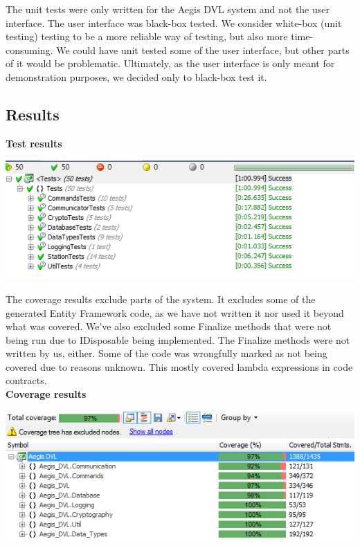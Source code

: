 \documentclass[a4paper]{report}
\begin{document}
The unit tests were only written for the Aegis DVL system and not the user interface. The user interface was black-box tested. We consider white-box (unit testing) testing to be a more reliable way of testing, but also more time-consuming. We could have unit tested some of the user interface, but other parts of it would be problematic. Ultimately, as the user interface is only meant for demonstration purposes, we decided only to black-box test it.

\subsection{Results}
\textbf{Test results}
\begin{center}
\includegraphics{TestRun.png}
\end{center}

The coverage results exclude parts of the system. It excludes some of the generated Entity Framework code, as we have not written it nor used it beyond what was covered.
We've also excluded some Finalize methods that were not being run due to IDisposable being implemented. The Finalize methods were not written by us, either. Some of the code was wrongfully marked as not being covered due to reasons unknown. This mostly covered lambda expressions in code contracts. \\

\textbf{Coverage results}
\begin{center}
\includegraphics{CoverageWithoutFinalize.png}
\end{center}
\end{document}
